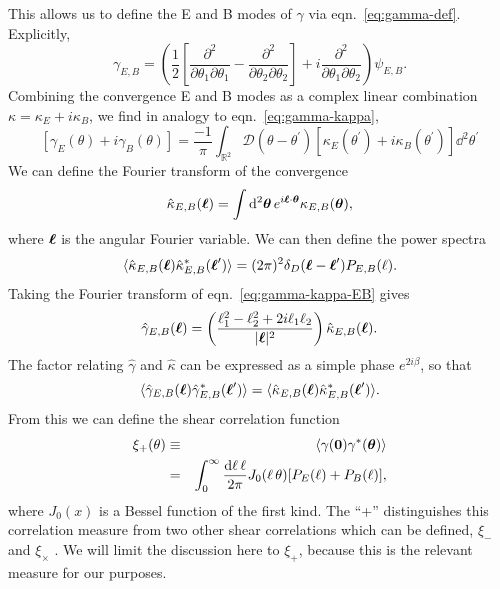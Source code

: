 This allows us to define the E and B modes of $\gamma$ via
eqn.~\ref{eq:gamma-def}.  Explicitly,
\begin{equation}
  \gamma_{E,B} = \left(\frac{1}{2}\left[\frac{\partial^2}{\partial \theta_1\partial\theta_1}
  - \frac{\partial^2}{\partial \theta_2\partial\theta_2}\right]
  + i\frac{\partial^2}{\partial \theta_1\partial\theta_2}\right)
  \psi_{E,B}.
\end{equation}
Combining the convergence E and B modes as a complex linear combination
$\kappa = \kappa_E + i\kappa_B$, we find in analogy to
eqn.~\ref{eq:gamma-kappa},
\begin{equation}
  \label{eq:gamma-kappa-EB}
  \left[\gamma_E(\theta) + i\gamma_B(\theta)\right]
  = \frac{-1}{\pi}\int_{\mathbb{R}^2} \mathcal{D}(\theta - 
  \theta^\prime)
  \left[\kappa_E(\theta^\prime) + i\kappa_B(\theta^\prime)\right]
  \dd^2\theta^\prime
\end{equation}
We can define the Fourier transform of the convergence
\begin{equation}
  \hat{\kappa}_{E,B}(\boldsymbol{\ell})
  = \int\mathrm{d}^2\boldsymbol{\theta}\,e^{i\boldsymbol{\ell}\cdot\boldsymbol{\theta}}
  \kappa_{E,B}(\boldsymbol{\theta}),
\end{equation}
where $\boldsymbol{\ell}$ is the angular Fourier variable.  We can then define
the power spectra \citep[e.g.][]{Schneider02b}
\begin{eqnarray}
  \langle\hat{\kappa}_{E, B}(\boldsymbol{\ell})
  \hat{\kappa}^\ast_{E,B}(\boldsymbol{\ell}^\prime)\rangle
  =(2\pi)^2\delta_D(\boldsymbol{\ell} - \boldsymbol{\ell}^\prime)P_{E,B}(\ell).
\end{eqnarray}
Taking the Fourier transform of eqn.~\ref{eq:gamma-kappa-EB} gives
\begin{equation}
  \hat{\gamma}_{E,B}(\boldsymbol{\ell})
  =\left(\frac{\ell_1^2 - \ell_2^2 + 2i\ell_1\ell_2}{|\boldsymbol{\ell}|^2}\right)
  \hat{\kappa}_{E,B}(\boldsymbol{\ell}).
\end{equation}
The factor relating $\hat{\gamma}$ and $\hat{\kappa}$ can be expressed
as a simple phase $e^{2i\beta}$, so that
\begin{equation}
  \langle\hat{\gamma}_{E, B}(\boldsymbol{\ell})
  \hat{\gamma}^\ast_{E,B}(\boldsymbol{\ell}^\prime)\rangle = 
  \langle\hat{\kappa}_{E, B}(\boldsymbol{\ell})
  \hat{\kappa}^\ast_{E,B}(\boldsymbol{\ell}^\prime)\rangle.
\end{equation}
From this we can define the shear correlation function
\begin{eqnarray}
  \label{eq:xi_plus}
  \xi_+(\theta)
  &\equiv& \langle\gamma(\boldsymbol{0})\gamma^\ast(\boldsymbol{\theta})\rangle\nonumber\\
  &=& \int_0^\infty\frac{\mathrm{d}\ell\,\ell}{2\pi}J_0(\ell\,\theta)
     [P_E(\ell) + P_B(\ell)],
\end{eqnarray}
where $J_0(x)$ is a Bessel function of the first kind.
The ``+'' distinguishes this correlation measure from two other shear
correlations which can be defined, $\xi_-$ and $\xi_\times$
\citep[see][for details]{Schneider02}.
We will limit the discussion here to $\xi_+$, because this is the relevant
measure for our purposes.

